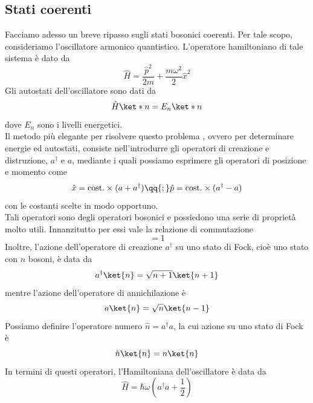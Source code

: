\subsection{Stati coerenti}
Facciamo adesso un breve ripasso sugli stati bosonici coerenti. Per tale scopo, consideriamo l'oscillatore armonico quantistico. L'operatore hamiltoniano di tale sistema è dato da
\begin{equation*}
   \hat{H} = \frac{\hat{p}^2}{2m} + \frac{m\omega^2}{2} \hat{x}^2
\end{equation*}
Gli autostati dell'oscillatore sono dati da
\begin{equation}
   \hat{H} \ket*{n} = E_n \ket*{n}
\end{equation}
dove $E_n$ sono i livelli energetici.\\
Il metodo più elegante per risolvere questo problema , ovvero per determinare energie ed autostati, consiste nell'introdurre gli operatori di creazione e distruzione, $a^{\dag}$ e $a$, mediante i quali possiamo esprimere gli operatori di posizione e momento come
\begin{equation*}
   \hat{x}=\text{cost.} \times (a + a^{\dag})
   \qq{;}
   \hat{p}=\text{cost.} \times (a^{\dag} - a)
\end{equation*}
con le costanti scelte in modo opportuno.\\
Tali operatori sono degli operatori bosonici e possiedono una serie di proprietà molto utili. Innanzitutto per essi vale la relazione di commutazione
\begin{equation}
   [a^{\dag}, a] = 1
   \label{eq:bosonic_commutation_relation}
\end{equation}
Inoltre, l'azione dell'operatore di creazione $a^{\dag}$ su uno stato di Fock, cioè uno stato con $n$ bosoni, è data da
\begin{equation*}
   a^{\dag} \ket{n} = \sqrt{n+1} \ket{n+1}
\end{equation*}
mentre l'azione dell'operatore di annichilazione è
\begin{equation*}
   a \ket{n} = \sqrt{n} \ket{n-1}
\end{equation*}
Possiamo definire l'operatore numero $\hat{n} = a^{\dag} a$, la cui azione su uno stato di Fock è
\begin{equation*}
   \hat{n} \ket{n} = n \ket{n}
\end{equation*}
In termini di questi operatori, l'Hamiltoniana dell'oscillatore è data da
\begin{equation*}
   \hat{H} = \hbar \omega \left( a^{\dag} a + \frac{1}{2} \right)
\end{equation*}
